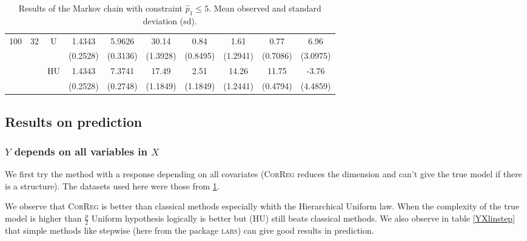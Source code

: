 \documentclass[11pt,a4paper]{article}
\begin{document}
\begin{table}[h!]
\begin{tabular}{|c|c|c|c|c|c|c|c|c|c|}
100 & 32 & U& 1.4343 & 5.9626 & 30.14 & 0.84 & 1.61 & 0.77 & 6.96  \\
& & & (0.2528) & (0.3136) & (1.3928) & (0.8495) & (1.2941) & (0.7086) & (3.0975) \\
 &  &HU & 1.4343 & 7.3741 & 17.49 & 2.51 & 14.26 & 11.75 & -3.76  \\
& & & (0.2528) & (0.2748) & (1.1849) & (1.1849) & (1.2441) & (0.4794) & (4.4859) \\
\hline
\end{tabular} 
\caption{Results of the Markov chain with  constraint $\hat{p}_1\leq 5$. Mean observed and standard deviation (sd). } \label{compZvrai}
\end{table}


\clearpage
\subsection{Results on prediction}
	\subsubsection{$Y$ depends on all variables in $X$}	 \label{tableMSEsimtout}	
We first try the method with a response depending on all covariates (\textsc{CorReg} reduces the dimension and can't give the true model if there is a structure). The datasets used here were those from \ref{compZvrai}.

We observe that \textsc{CorReg} is better than classical methods especially whith the Hierarchical Uniform law. When the complexity of the true model is higher than $\frac{p}{2}$ Uniform hypothesis logically is better but (HU) still beats classical methods. We also observe in table \ref{YXlinstep} that simple methods like stepwise (here from the package \textsc{lars}) can give good results in prediction.
\end{document}
